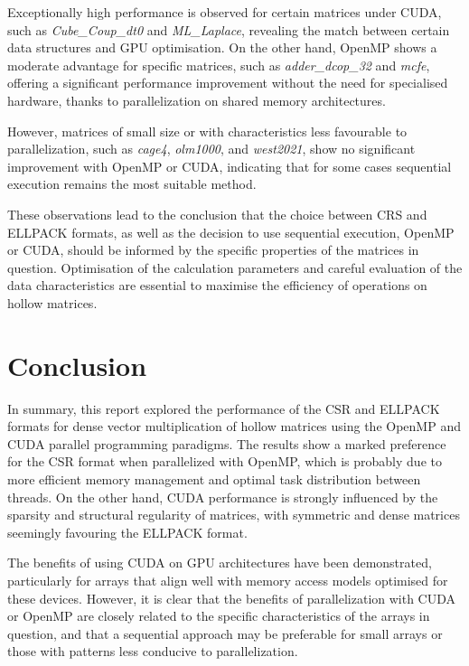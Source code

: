 \documentclass[12pt,oneside]{book} %
\begin{document}
Exceptionally high performance is observed for certain matrices under CUDA,
such as \textit{Cube\_Coup\_dt0} and \textit{ML\_Laplace}, revealing the match
between certain data structures and GPU optimisation. On the other hand, OpenMP
shows a moderate advantage for specific matrices, such as
\textit{adder\_dcop\_32} and \textit{mcfe}, offering a significant performance
improvement without the need for specialised hardware, thanks to
parallelization on shared memory architectures.

However, matrices of small size or with characteristics less favourable to
parallelization, such as \textit{cage4}, \textit{olm1000}, and
\textit{west2021}, show no significant improvement with OpenMP or CUDA,
indicating that for some cases sequential execution remains the most suitable
method.

These observations lead to the conclusion that the choice between CRS and
ELLPACK formats, as well as the decision to use sequential execution, OpenMP or
CUDA, should be informed by the specific properties of the matrices in
question. Optimisation of the calculation parameters and careful evaluation of
the data characteristics are essential to maximise the efficiency of operations
on hollow matrices.

\chapter{Conclusion}

In summary, this report explored the performance of the CSR and ELLPACK formats
for dense vector multiplication of hollow matrices using the OpenMP and CUDA
parallel programming paradigms. The results show a marked preference for the
CSR format when parallelized with OpenMP, which is probably due to more
efficient memory management and optimal task distribution between threads. On
the other hand, CUDA performance is strongly influenced by the sparsity and
structural regularity of matrices, with symmetric and dense matrices seemingly
favouring the ELLPACK format.

The benefits of using CUDA on GPU architectures have been demonstrated,
particularly for arrays that align well with memory access models optimised for
these devices. However, it is clear that the benefits of parallelization with
CUDA or OpenMP are closely related to the specific characteristics of the
arrays in question, and that a sequential approach may be preferable for small
arrays or those with patterns less conducive to parallelization.
\end{document}
